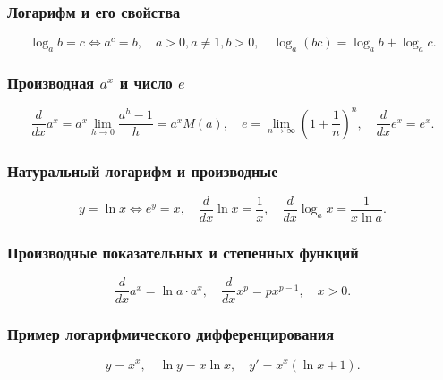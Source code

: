\documentclass[12pt, a4paper]{article}
\begin{document}
\subsubsection*{Логарифм и его свойства}
\[
\log_a b = c \iff a^c = b, \quad a>0, a\neq 1, b>0,
\quad \log_a(bc) = \log_a b + \log_a c.
\]

\subsubsection*{Производная \(a^x\) и число \(e\)}
\[
\frac{d}{dx}a^x = a^x \lim_{h\to0} \frac{a^h - 1}{h} = a^x M(a),
\quad e = \lim_{n\to\infty} \left(1 + \frac{1}{n}\right)^n,
\quad \frac{d}{dx} e^x = e^x.
\]

\subsubsection*{Натуральный логарифм и производные}
\[
y = \ln x \iff e^y = x, \quad \frac{d}{dx} \ln x = \frac{1}{x},
\quad \frac{d}{dx} \log_a x = \frac{1}{x \ln a}.
\]

\subsubsection*{Производные показательных и степенных функций}
\[
\frac{d}{dx} a^x = \ln a \cdot a^x,
\quad \frac{d}{dx} x^p = p x^{p-1}, \quad x>0.
\]

\subsubsection*{Пример логарифмического дифференцирования}
\[
y = x^x, \quad \ln y = x \ln x, \quad y' = x^x (\ln x + 1).
\]
\end{document}
